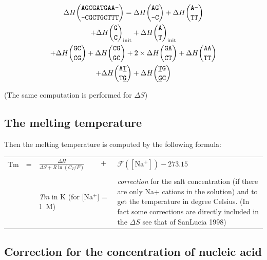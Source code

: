 \documentclass{article}
\begin{document}
\begin{multline*}
\Delta H {\mbox{\texttt{AGCGATGAA-}} \choose \mbox{\texttt{-CGCTGCTTT}}} = 
\Delta H {\mbox{\texttt{AG}} \choose \mbox{\texttt{-C}} } + 
\Delta H {\mbox{\texttt{A-}} \choose \mbox{\texttt{TT}} } \\ +
\Delta H {\mbox{\texttt{G}} \choose \mbox{\texttt{C}} }_\mathrm{init} +
\Delta H {\mbox{\texttt{A}} \choose \mbox{\texttt{T}} }_\mathrm{init} \\ +
\Delta H {\mbox{\texttt{GC}} \choose \mbox{\texttt{CG}} } +
\Delta H {\mbox{\texttt{CG}} \choose \mbox{\texttt{GC}} } +
2 \times \Delta H {\mbox{\texttt{GA}} \choose \mbox{\texttt{CT}} } +
\Delta H {\mbox{\texttt{AA}} \choose \mbox{\texttt{TT}} } \\ +
\Delta H {\mbox{\texttt{A\underline{T}}} \choose \mbox{\texttt{T\underline{G}}} } +
\Delta H {\mbox{\texttt{\underline{T}G}} \choose \mbox{\texttt{\underline{G}C}} }
\end{multline*}

       (The same computation is performed for $\Delta S$)


\subsection{The melting temperature }  
Then the melting temperature is computed by the following formula:   

\begin{tabular}{rcp{1.6in}p{2.2in}}
Tm & = & \begin{math} \frac{\Delta{}H}{\Delta{}S + R \ln (C_T/F)} \hspace{2em} + \end{math} & \begin{math}\mathcal{F}([\mathrm{Na}^+]) - 273.15 \end{math} \\
   &   &                                                                                          &                                                       \\
   &   & \footnotesize \textit{Tm} in K (for [Na$^+$] = 1~M)    &\footnotesize \emph{correction} for the 
salt concentration (if there are only Na+ cations in the solution) and to get the temperature in degree Celsius. (In fact 
some corrections are directly included in the $\Delta S$ see that of SanLucia 
1998)    
\end{tabular}
   
\subsection{Correction for the concentration of nucleic acid }  
\end{document}
